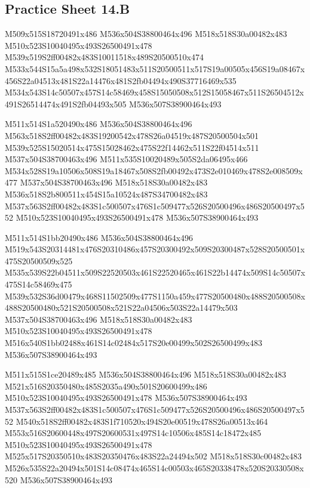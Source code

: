 \documentclass{article}
\begin{document}
\subsection{Practice Sheet 14.B}

\begin{multicols}{5}
\begin{center}

M509x515S18720491x486 %
M536x504S38800464x496 %
M518x518S30a00482x483 %
M510x523S10040495x493S26500491x478 %
M539x519S2ff00482x483S10011518x489S20500510x474 %
M533x544S15a5a498x532S18051483x511S20500511x517S19a00505x456S19a08467x456S22a04513x481S22a14476x481S2fb04494x490S37716469x535 %
M534x543S14c50507x457S14c58469x458S15050508x512S15058467x511S26504512x491S26514474x491S2fb04493x505 %
M536x507S38900464x493 %
\vfil
\columnbreak

M511x514S1a520490x486 %
M536x504S38800464x496 %
M563x518S2ff00482x483S19200542x478S26a04519x487S20500504x501 %
M539x525S15020514x475S15028462x475S22f14462x511S22f04514x511 %
M537x504S38700463x496 %
M511x535S10020489x505S2da06495x466 %
M534x528S19a10506x508S19a18467x508S2fb00492x473S2e010469x478S2e008509x477 %
M537x504S38700463x496 %
M518x518S30a00482x483 %
M536x518S2b800511x454S15a10524x487S34700482x483 %
M537x563S2ff00482x483S1c500507x476S1c509477x526S20500496x486S20500497x552 %
M510x523S10040495x493S26500491x478 %
M536x507S38900464x493 %
\vfil
\columnbreak

M511x514S1bb20490x486 %
M536x504S38800464x496 %
M519x543S20314481x476S20310486x457S20300492x509S20300487x528S20500501x475S20500509x525 %
M535x539S22b04511x509S22520503x461S22520465x461S22b14474x509S14c50507x475S14c58469x475 %
M539x532S36d00479x468S11502509x477S1150a459x477S20500480x488S20500508x488S20500480x521S20500508x521S22a04506x503S22a14479x503 %
M537x504S38700463x496 %
M518x518S30a00482x483 %
M510x523S10040495x493S26500491x478 %
M516x540S1bb02488x461S14c02484x517S20e00499x502S26500499x483 %
M536x507S38900464x493 %
\vfil
\columnbreak

M511x515S1ce20489x485 %
M536x504S38800464x496 %
M518x518S30a00482x483 %
M521x516S20350480x485S2035a490x501S20600499x486 %
M510x523S10040495x493S26500491x478 %
M536x507S38900464x493 %
M537x563S2ff00482x483S1c500507x476S1c509477x526S20500496x486S20500497x552 %
M540x518S2ff00482x483S1f710520x494S20e00519x478S26a00513x464 %
M553x516S20600448x497S20600531x497S14c10506x485S14c18472x485 %
M510x523S10040495x493S26500491x478 %
M525x517S20350510x483S20350476x483S22a24494x502 %
M518x518S30c00482x483 %
M526x535S22a20494x501S14c08474x465S14c00503x465S20338478x520S20330508x520 %
M536x507S38900464x493 %
\vfil
\columnbreak


\end{center}
\end{multicols}
\end{document}
